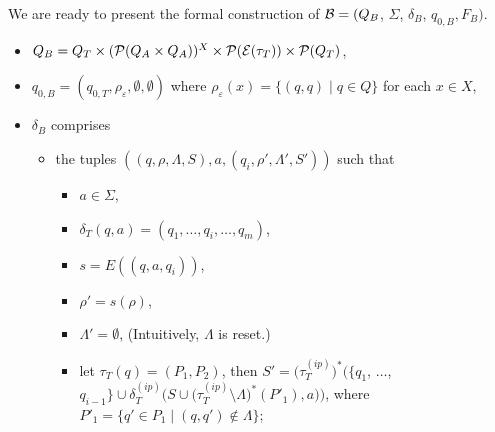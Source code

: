                     We are ready to present the formal construction of $\mathcal{B} =  (Q_B$, $\Sigma$, $\delta_B$, $q_{0, B}, F_B)$. 
                    \begin{itemize}
                        \item $Q_B = Q_T \times (\mathcal{P}(Q_A \times Q_A ))^{X} \times \mathcal{P}(\mathcal{E}(\tau_T)) \times \mathcal{P}(Q_T)$, 

                        \item $q_{0, B} = (q_{0,T}, \rho_{\varepsilon}, \emptyset, \emptyset)$ where $\rho_{\varepsilon} (x) = \{(q, q) \mid q \in Q\}$ for each $x \in X$,

                        \item $\delta_{B}$ comprises 
                            \begin{itemize}
                                \item the tuples $((q, \rho, \Lambda, S), a, (q_i, \rho', \Lambda', S'))$ such that  
                                    \begin{itemize}
                                        \item $a \in \Sigma$, 
                                        \item $\delta_T (q, a) = (q_1, \ldots, q_i, \ldots, q_m)$, 
                                        \item $s = E((q, a, q_i))$, 
                                        \item $\rho' = s(\rho)$,
                                        \item $\Lambda' = \emptyset$, (Intuitively, $\Lambda$ is reset.)
                                        \item let $\tau_T(q) = (P_1, P_2)$, then $S' = \big(\tau^{(ip)}_T\big)^\ast\big(\{ q_1$, $\ldots$, $q_{i - 1} \} \cup \delta^{(ip)}_T\big(S \cup \big(\tau^{(ip)}_T \setminus \Lambda\big)^\ast(P'_1), a\big)\big)$, where $P'_1 = \{q' \in P_1 \mid (q, q') \not \in \Lambda\}$;  

\end{itemize}
\end{itemize}
\end{itemize}

